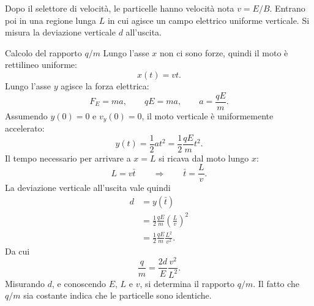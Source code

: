\documentclass[a4paper]{article}
\begin{document}
Dopo il selettore di velocità, le particelle hanno velocità nota \(v=E/B\). Entrano poi in una regione lunga \(L\) in cui agisce un campo elettrico uniforme verticale. Si misura la deviazione verticale \(d\) all'uscita.

\begin{center}
\end{center}

\begin{snippetsolution}{Calcolo del rapporto \(q/m\)}
    Lungo l'asse \(x\) non ci sono forze, quindi il moto è rettilineo uniforme:
    \[
        x(t)=vt.
    \]
    Lungo l'asse \(y\) agisce la forza elettrica:
    \[
        F_E=ma,
        \qquad
        qE=ma,
        \qquad
        a=\frac{qE}{m}.
    \]
    Assumendo \(y(0)=0\) e \(v_y(0)=0\), il moto verticale è uniformemente accelerato:
    \[
        y(t)=\frac{1}{2}at^2=\frac{1}{2}\frac{qE}{m}t^2.
    \]
    Il tempo necessario per arrivare a \(x=L\) si ricava dal moto lungo \(x\):
    \[
        L=v\bar{t}
        \qquad\Longrightarrow\qquad
        \bar{t}=\frac{L}{v}.
    \]
    La deviazione verticale all'uscita vale quindi
    \begin{align*}
        d
        &=y(\bar{t}) \\
        &=\frac{1}{2}\frac{qE}{m}\left(\frac{L}{v}\right)^2 \\
        &=\frac{1}{2}\frac{qE}{m}\frac{L^2}{v^2}.
    \end{align*}
    Da cui
    \[
        \frac{q}{m}=\frac{2d}{E}\frac{v^2}{L^2}.
    \]
    Misurando \(d\), e conoscendo \(E\), \(L\) e \(v\), si determina il rapporto \(q/m\). Il fatto che \(q/m\) sia costante indica che le particelle sono identiche.
\end{snippetsolution}
\end{document}
